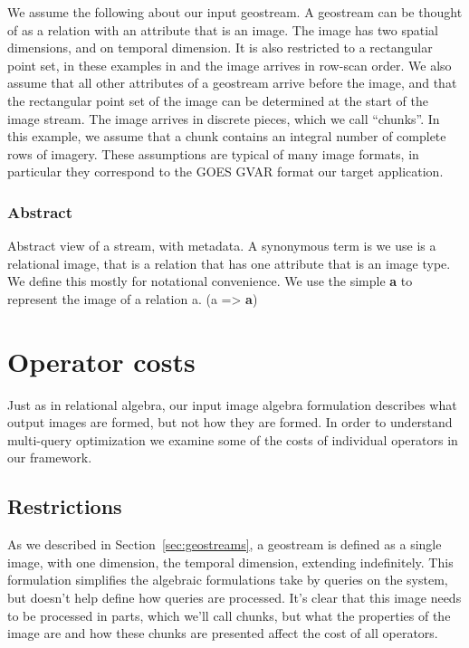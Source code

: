 \documentclass{vldb}
\begin{document}
We assume the following about our input geostream.  A geostream can be
thought of as a relation with an attribute that is an image.  The
image has two spatial dimensions, and on temporal dimension.  It is
also restricted to a rectangular point set, in these examples in \Zp[3]
and the image arrives in row-scan order.  We also assume that all
other attributes of a geostream arrive before the image, and that the
rectangular point set of the image can be determined at the start of
the image stream.  The image arrives in discrete pieces, which we call
``chunks''.  In this example, we assume that a chunk contains an
integral number of complete rows of imagery.  These assumptions are
typical of many image formats, in particular they correspond to the
GOES GVAR format our target application.

\subsubsection{Abstract}

Abstract view of a stream, with metadata.  A synonymous term is we use
is a relational image, that is a relation that has one attribute that
is an image type.  We define this mostly for notational convenience.
We use the simple {\bf a} to represent the image of a relation a.
(a => {\bf a})

\section{Operator costs}

Just as in relational algebra, our input image algebra formulation
describes what output images are formed, but not how they are formed.
In order to understand multi-query optimization we examine some of the
costs of individual operators in our framework.  

\subsection{Restrictions}

As we described in Section~\ref{sec:geostreams}, a geostream is
defined as a single image, with one dimension, the temporal dimension,
extending indefinitely.  This formulation simplifies the algebraic
formulations take by queries on the system, but doesn't help define
how queries are processed.  It's clear that this image needs to be
processed in parts, which we'll call chunks, but what the properties
of the image are and how these chunks are presented affect the cost of all
operators.
\end{document}

